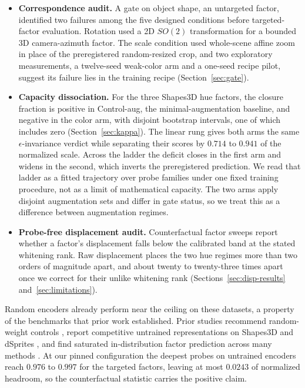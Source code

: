 \documentclass[10pt]{article}
\begin{document}
\begin{itemize}
\item \textbf{Correspondence audit.} A gate on object shape, an untargeted factor, identified two failures among
the five designed conditions before targeted-factor evaluation.
Rotation used a 2D $SO(2)$ transformation for a bounded 3D camera-azimuth factor. The
scale condition used whole-scene affine zoom in place of the preregistered random-resized crop, and
two exploratory measurements, a twelve-seed weak-color arm and a one-seed recipe pilot, suggest its
failure lies in the training recipe (Section~\ref{sec:gate}).

\item \textbf{Capacity dissociation.} For the three Shapes3D hue factors, the closure fraction
is positive in Control-aug, the minimal-augmentation baseline, and negative in the color arm,
with disjoint bootstrap intervals, one of which includes zero (Section~\ref{sec:kappa}). The
linear rung gives both arms the same $\epsilon$-invariance verdict while separating their scores
by $0.714$ to $0.941$ of the normalized scale. Across the ladder the deficit closes in the first
arm and widens in the second, which inverts the preregistered prediction. We read that ladder as
a fitted trajectory over probe families under one fixed training procedure, not as a limit of
mathematical capacity. The two arms apply disjoint augmentation
sets and differ in gate status, so we treat this as a difference between augmentation regimes.

\item \textbf{Probe-free displacement audit.} Counterfactual factor sweeps report whether a factor's
displacement falls below the calibrated band at the stated whitening rank. Raw displacement places
the two hue regimes more than
two orders of magnitude apart, and about twenty to twenty-three times apart once we correct for
their unlike whitening rank (Sections~\ref{sec:disp-results} and~\ref{sec:limitations}).
\end{itemize}

Random encoders already perform near the ceiling on these datasets, a property of the benchmarks
that prior work established. Prior studies recommend random-weight controls
\citep{saxe2011random}, report competitive untrained representations on Shapes3D and dSprites
\citep{cao2022empirical,maziarka2021relationship}, and find saturated in-distribution factor
prediction across many methods \citep{schott2022visual}. At our pinned configuration the deepest
probes on untrained encoders reach $0.976$ to $0.997$ for the targeted factors, leaving at most
$0.0243$ of normalized headroom, so the counterfactual statistic carries the positive claim.
\end{document}
